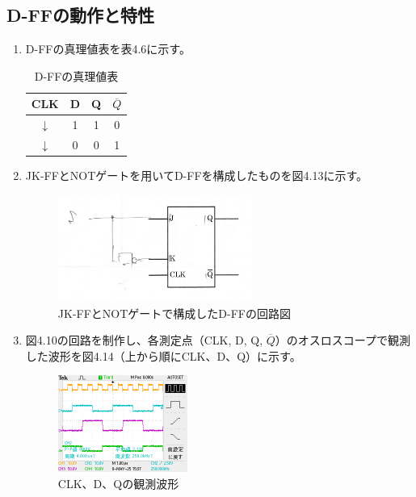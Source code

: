 \documentclass{jlreq}
\numberwithin{equation}{section}
\begin{document}
\subsection{D-FFの動作と特性}
\begin{enumerate}
  \item D-FFの真理値表を表4.6に示す。
  
  \begin{table}[H]
    \centering
    \caption{D-FFの真理値表}
    \begin{tabular}{|c|c|c|c|}
      \hline
      CLK & D & Q & $\overline{Q}$ \\ \hline
      $\downarrow$ & 1 & 1 & 0 \\ \hline
      $\downarrow$ & 0 & 0 & 1 \\ \hline
    \end{tabular}
  \end{table}

  \item JK-FFとNOTゲートを用いてD-FFを構成したものを図4.13に示す。
  
  \begin{figure}[H]
  \centering
  \includegraphics[width=0.6\textwidth]{assets/dffkairo.png}
  \caption{JK-FFとNOTゲートで構成したD-FFの回路図}
  \end{figure}

  \item 図4.10の回路を制作し、各測定点（CLK, D, Q, \(\overline{Q}\)）のオスロスコープで観測した波形を図4.14（上から順にCLK、D、Q）に示す。
  
  \begin{figure}[H]
  \centering
  \includegraphics[width=0.4\textwidth]{assets/dff.png}
  \caption{CLK、D、Qの観測波形}
  \end{figure}


\end{enumerate}
\end{document}
